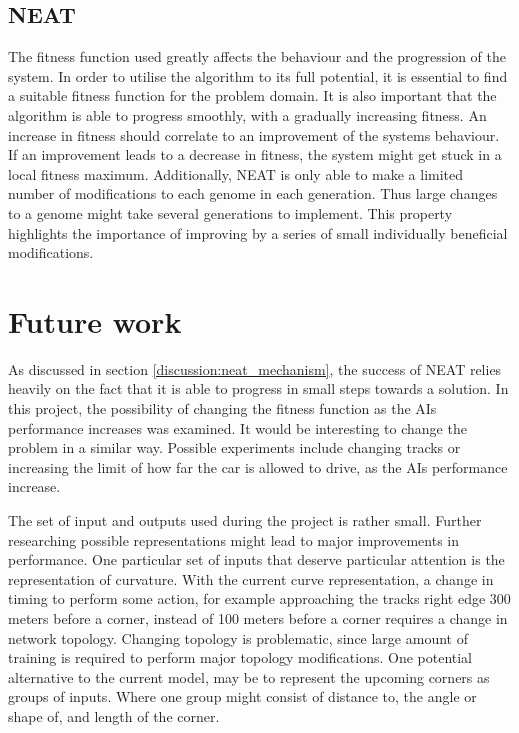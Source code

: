 \section{NEAT}
\label{conclusion_neat}
The fitness function used greatly affects the behaviour and the progression of the system. In order to utilise the algorithm to its full potential, it is essential to find a suitable fitness function for the problem domain. It is also important that the algorithm is able to progress smoothly, with a gradually increasing fitness. An increase in fitness should correlate to an improvement of the systems behaviour. If an improvement leads to a decrease in fitness, the system might get stuck in a local fitness maximum. Additionally, NEAT is only able to make a limited number of modifications to each genome in each generation. Thus large changes to a genome might take several generations to implement. This property highlights the importance of improving by a series of small individually beneficial modifications. 


\chapter{Future work}
As discussed in section \ref{discussion:neat_mechanism}, the success of NEAT relies heavily on the fact that it is able to progress in small steps towards a solution. In this project, the possibility of changing the fitness function as the AIs performance increases was examined. It would be interesting to change the problem in a similar way. Possible experiments include changing tracks or increasing the limit of how far the car is allowed to drive, as the AIs performance increase.

The set of input and outputs used during the project is rather small. Further researching possible representations might lead to major improvements in performance. One particular set of inputs that deserve particular attention is the representation of curvature. With the current curve representation, a change in timing to perform some action, for example approaching the tracks right edge 300 meters before a corner, instead of 100 meters before a corner requires a change in network topology. Changing topology is problematic, since large amount of training is required to perform major topology modifications. One potential alternative to the current model, may be to represent the upcoming corners as groups of inputs. Where one group might consist of distance to, the angle or shape of, and length of the corner.

